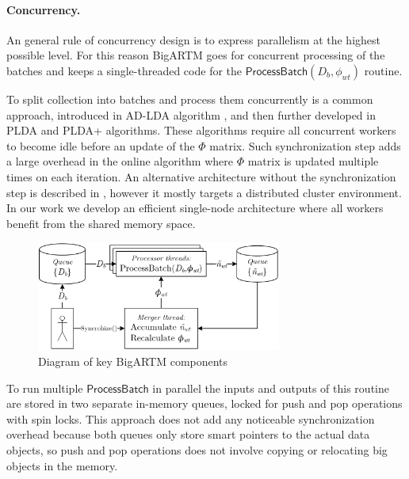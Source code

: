 \documentclass[russian]{llncs}
\newcommand{\kw}[1]{\textsf{#1}}
\begin{document}
\paragraph{Concurrency.}
An general rule of concurrency design is to express parallelism at the highest possible level.
For this reason BigARTM goes for concurrent processing of the batches
and keeps a single-threaded code for the $\kw{ProcessBatch}(D_b, \phi_{wt})$ routine.

To split collection into batches and process them concurrently is a common approach,
introduced in AD-LDA algorithm \cite{newman2009distributed}, and
then further developed in PLDA \cite{wang2009plda} and PLDA{+} \cite{liu2011plda+} algorithms.
These algorithms require all concurrent workers to become idle before an update of the $\Phi$ matrix.
Such synchronization step adds a large overhead in the online algorithm where $\Phi$ matrix is updated multiple times on each iteration.
An alternative architecture without the synchronization step is described in \cite{smola2010architecture},
however it mostly targets a distributed cluster environment.
In our work we develop an efficient single-node architecture where all workers benefit from the shared memory space.

\begin{figure}[t]
\begin{centering}
\includegraphics[height=36mm]{diagramm_artm_core.eps}
\caption{Diagram of key BigARTM components}
\label{fig:diagramm_artm_core}
\end{centering}
\end{figure}

To run multiple $\kw{ProcessBatch}$ in parallel the inputs and outputs of this routine are stored in two separate in-memory queues,
locked for push and pop operations with spin locks.
This approach does not add any noticeable synchronization overhead because
both queues only store smart pointers to the actual data objects,
so push and pop operations does not involve copying or relocating big objects in the memory.
\end{document}
